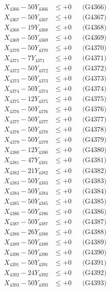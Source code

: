 \documentclass[a4paper,10pt]{article}
\begin{document}
{\begin{align}
X_{4366} - 50Y_{4366} &\leq +0 && \text{(G4366)} \\
X_{4367} - 50Y_{4367} &\leq +0 && \text{(G4367)} \\
X_{4368} - 19Y_{4368} &\leq +0 && \text{(G4368)} \\
X_{4369} - 50Y_{4369} &\leq +0 && \text{(G4369)} \\
X_{4370} - 50Y_{4370} &\leq +0 && \text{(G4370)} \\
\allowbreak
X_{4371} - 7Y_{4371} &\leq +0 && \text{(G4371)} \\
X_{4372} - 50Y_{4372} &\leq +0 && \text{(G4372)} \\
X_{4373} - 50Y_{4373} &\leq +0 && \text{(G4373)} \\
X_{4374} - 50Y_{4374} &\leq +0 && \text{(G4374)} \\
X_{4375} - 12Y_{4375} &\leq +0 && \text{(G4375)} \\
X_{4376} - 50Y_{4376} &\leq +0 && \text{(G4376)} \\
X_{4377} - 50Y_{4377} &\leq +0 && \text{(G4377)} \\
X_{4378} - 50Y_{4378} &\leq +0 && \text{(G4378)} \\
X_{4379} - 50Y_{4379} &\leq +0 && \text{(G4379)} \\
X_{4380} - 12Y_{4380} &\leq +0 && \text{(G4380)} \\
\allowbreak
X_{4381} - 47Y_{4381} &\leq +0 && \text{(G4381)} \\
X_{4382} - 21Y_{4382} &\leq +0 && \text{(G4382)} \\
X_{4383} - 50Y_{4383} &\leq +0 && \text{(G4383)} \\
X_{4384} - 50Y_{4384} &\leq +0 && \text{(G4384)} \\
X_{4385} - 50Y_{4385} &\leq +0 && \text{(G4385)} \\
X_{4386} - 50Y_{4386} &\leq +0 && \text{(G4386)} \\
X_{4387} - 50Y_{4387} &\leq +0 && \text{(G4387)} \\
X_{4388} - 26Y_{4388} &\leq +0 && \text{(G4388)} \\
X_{4389} - 50Y_{4389} &\leq +0 && \text{(G4389)} \\
X_{4390} - 50Y_{4390} &\leq +0 && \text{(G4390)} \\
\allowbreak
X_{4391} - 50Y_{4391} &\leq +0 && \text{(G4391)} \\
X_{4392} - 24Y_{4392} &\leq +0 && \text{(G4392)} \\
X_{4393} - 50Y_{4393} &\leq +0 && \text{(G4393)} \\

\end{align}}
\end{document}
